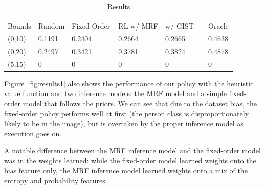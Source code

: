 \begin{table}[t]
\caption{Results}
\label{tab:results}
\begin{center}
\begin{tabular}{|l|l|l|l|l|l|}
\\ \hline \\
Bounds & Random & Fixed Order & RL w/ MRF & w/ GIST   & Oracle \\ \hline
(0,10) & 0.1191 & 0.2404      & 0.2664    & 0.2665    & 0.4638 \\ 
(0,20) & 0.2497 & 0.3421      & 0.3781    & 0.3824    & 0.4878 \\ 
(5,15) & 0      & 0           & 0         & 0         & 0      \\
\end{tabular}
\end{center}
\end{table}

Figure~\ref{fig:results1} also shows the performance of our policy with the heuristic value function and two inference models: the MRF model and a simple fixed-order model that follows the priors.
We can see that due to the dataset bias, the fixed-order policy performs well at first (the person class is disproportionately likely to be in the image), but is overtaken by the proper inference model as execution goes on.

A notable difference between the MRF inference model and the fixed-order model was in the weights learned: while the fixed-order model learned weights onto the bias feature only, the MRF inference model learned weights onto a mix of the entropy and probability features
